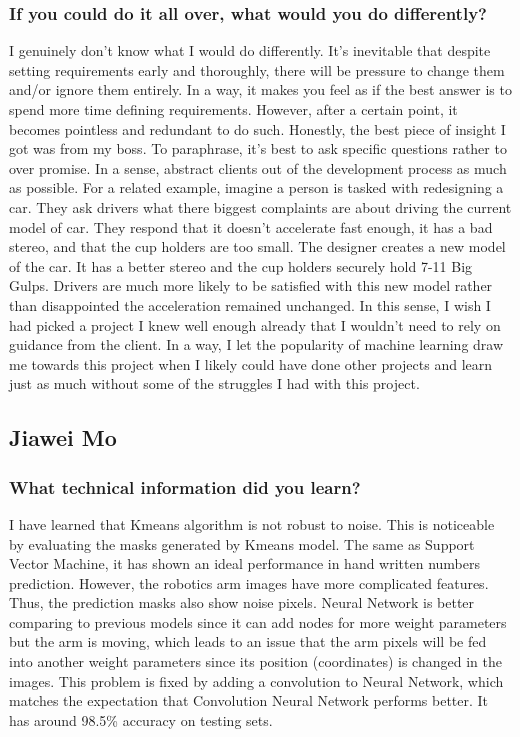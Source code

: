 \documentclass[10pt,journal,compsoc, draftclsnofoot,onecolumn]{IEEEtran}
\begin{document}
\subsubsection{If you could do it all over, what would you do differently?}
I genuinely don't know what I would do differently.
It's inevitable that despite setting requirements early and thoroughly, there will be pressure to change them and/or ignore them entirely.
In a way, it makes you feel as if the best answer is to spend more time defining requirements.
However, after a certain point, it becomes pointless and redundant to do such.
Honestly, the best piece of insight I got was from my boss.
To paraphrase, it's best to ask specific questions rather to over promise.
In a sense, abstract clients out of the development process as much as possible.
For a related example, imagine a person is tasked with redesigning a car.
They ask drivers what there biggest complaints are about driving the current model of car.
They respond that it doesn't accelerate fast enough, it has a bad stereo, and that the cup holders are too small.
The designer creates a new model of the car.
It has a better stereo and the cup holders securely hold 7-11 Big Gulps.
Drivers are much more likely to be satisfied with this new model rather than disappointed the acceleration remained unchanged.
In this sense, I wish I had picked a project I knew well enough already that I wouldn't need to rely on guidance from the client.
In a way, I let the popularity of machine learning draw me towards this project when I likely could have done other projects and learn just as much without some of the struggles I had with this project.


\subsection{Jiawei Mo}
\subsubsection{What technical information did you learn?}
I have learned that Kmeans algorithm is not robust to noise. This is noticeable by evaluating the masks generated by Kmeans model. The same as Support Vector Machine, it has shown an ideal performance in hand written numbers prediction. However, the robotics arm images have more complicated features. Thus, the prediction masks also show noise pixels. Neural Network is better comparing to previous models since it can add nodes for more weight parameters but the arm is moving, which leads to an issue that the arm pixels will be fed into another weight parameters since its position (coordinates) is changed in the images. This problem is fixed by adding a convolution to Neural Network, which matches the expectation that Convolution Neural Network performs better. It has around 98.5\% accuracy on testing sets.
\end{document}
